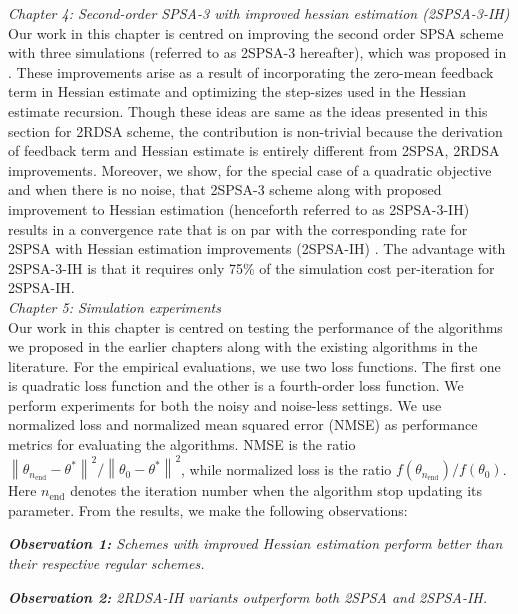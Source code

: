 \documentclass[12pt]{article}
\renewcommand{\l}{\left\|}
\renewcommand{\r}{\right\|}
\begin{document}
 
 
 
 \textit{Chapter 4: Second-order SPSA-3 with improved hessian estimation (2SPSA-3-IH)}\\
 
 
 
Our work in this chapter is centred on improving the second order SPSA scheme with three simulations (referred to as 2SPSA-3 hereafter), which was proposed in  \cite{bhatnagar2015simultaneous}. These improvements arise as a result of incorporating the zero-mean feedback term in Hessian estimate and optimizing the step-sizes used in the Hessian estimate recursion. Though these ideas are same as the ideas presented in this section for 2RDSA scheme, the contribution is non-trivial because the derivation of feedback term and Hessian estimate is entirely different from 2SPSA, 2RDSA improvements. Moreover, we show, for the special case of a quadratic objective and when there is no noise, that 2SPSA-3 scheme along with proposed improvement to Hessian estimation (henceforth referred to as 2SPSA-3-IH) results in a convergence rate that is on par with the corresponding rate for 2SPSA with Hessian estimation improvements (2SPSA-IH) \cite{spall-jacobian}. The advantage with 2SPSA-3-IH is that it requires only 75\% of the simulation cost per-iteration for 2SPSA-IH. \\


\textit{Chapter 5: Simulation experiments}\\

Our work in this chapter is centred on testing the performance of the algorithms we proposed in the earlier chapters along with the existing algorithms in the literature. For the empirical evaluations, we use two loss functions. The first one is quadratic  loss  function and the other is a fourth-order loss function. We perform experiments for both the noisy and noise-less settings. We use normalized loss and normalized mean squared error (NMSE) as performance metrics for evaluating the algorithms. NMSE is the ratio $\l \theta_{n_\text{end}} - \theta^* \r^2 / \l \theta_0 - \theta^*\r^2$, while normalized loss is the ratio $f(\theta_{n_\text{end}})/f(\theta_0)$. Here $n_\text{end}$ denotes the iteration number when the algorithm stop updating its parameter. From the results, we make the following observations:
 
 \textit{\textbf{Observation 1:} Schemes with improved Hessian estimation perform better than their respective regular schemes.}
 
\textit{\textbf{Observation 2:} 2RDSA-IH variants outperform both 2SPSA and 2SPSA-IH.}
\end{document}
